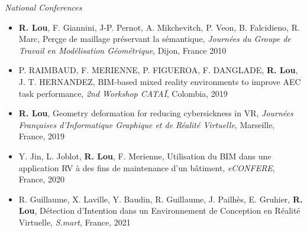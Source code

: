 \documentclass{res}
\begin{document}
\begin{resume}
{\sl National Conferences}  
\begin{itemize}
		\item {\bf R. Lou}, F. Giannini, J-P. Pernot, A. Mikchevitch, P. Veon, B. Falcidieno, R. Marc, Perçge de maillage préservant la sémantique, {\it  Journées du Groupe de Travail en Modélisation Géométrique}, Dijon, France 2010
		\item P. RAIMBAUD, F. MERIENNE, P. FIGUEROA, F. DANGLADE, {\bf R. Lou}, J. T. HERNANDEZ, BIM-based mixed reality environments to improve AEC task performance, {\it 2nd Workshop CATAÏ}, Colombia, 2019
		\item {\bf R. Lou}, Geometry deformation for reducing cybersickness in VR, {\it  Journées Françaises d’Informatique Graphique et de Réalité Virtuelle}, Marseille, France, 2019
		\item Y. Jin, L. Joblot, {\bf R. Lou}, F. Merienne, Utilisation du BIM dans une application RV à des fins de maintenance d'un bâtiment, {\it  eCONFERE}, France, 2020
		\item R. Guillaume, X. Laville, Y. Baudin, R. Guillaume, J. Pailhès, E. Gruhier, {\bf R. Lou}, Détection d’Intention dans un Environnement de Conception en Réalité Virtuelle, {\it  S.mart}, France, 2021
		
\end{itemize}
 
 
\end{resume} 
\end{document}
